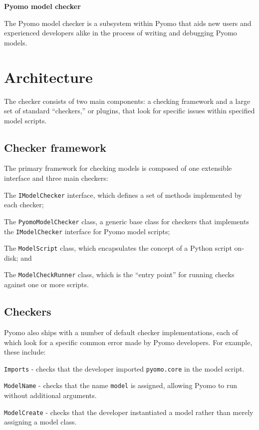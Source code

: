 \documentclass{article}
\begin{document}
\begin{center}
{\huge \textbf{Pyomo model checker}}
\end{center}

The Pyomo model checker is a subsystem within Pyomo that aids new users and experienced developers alike in the process of writing and debugging Pyomo models. 

\section*{Architecture}
The checker consists of two main components: a checking framework and a large set of standard ``checkers,'' or plugins, that look for specific issues within specified model scripts.

\subsection*{Checker framework}
The primary framework for checking models is composed of one extensible interface and three main checkers:

\begin{itemize*}
\item The \verb!IModelChecker! interface, which defines a set of methods implemented by each checker;
\item The \verb!PyomoModelChecker! class, a generic base class for checkers that implements the \verb!IModelChecker! interface for Pyomo model scripts;
\item The \verb!ModelScript! class, which encapsulates the concept of a Python script on-disk; and
\item The \verb!ModelCheckRunner! class, which is the ``entry point'' for running checks against one or more scripts.
\end{itemize*}

\subsection*{Checkers}
Pyomo also ships with a number of default checker implementations, each of which look for a specific common error made by Pyomo developers. For example, these include:

\begin{itemize*}
\item \verb!Imports! - checks that the developer imported \verb!pyomo.core! in the model script.
\item \verb!ModelName! - checks that the name \verb!model! is assigned, allowing Pyomo to run without additional arguments.
\item \verb!ModelCreate! - checks that the developer instantiated a model rather than merely assigning a model class.
\end{itemize*}
\end{document}
